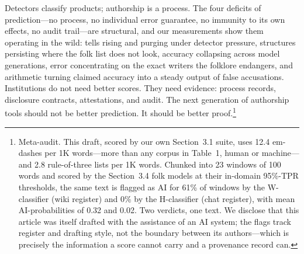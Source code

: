 \documentclass[sigconf,nonacm]{acmart}
\begin{document}
Detectors classify products; authorship is a process. The four deficits of prediction---no process, no individual error guarantee, no immunity to its own effects, no audit trail---are structural, and our measurements show them operating in the wild: tells rising and purging under detector pressure, structures persisting where the folk list does not look, accuracy collapsing across model generations, error concentrating on the exact writers the folklore endangers, and arithmetic turning claimed accuracy into a steady output of false accusations. Institutions do not need better scores. They need evidence: process records, disclosure contracts, attestations, and audit. The next generation of authorship tools should not be better prediction. It should be better proof.\footnote{Meta-audit. This draft, scored by our own Section~3.1 suite, uses 12.4 em-dashes per 1K words---more than any corpus in Table~1, human or machine---and 2.8 rule-of-three lists per 1K words. Chunked into 23 windows of 100 words and scored by the Section~3.4 folk models at their in-domain 95\%-TPR thresholds, the same text is flagged as AI for 61\% of windows by the W-classifier (wiki register) and 0\% by the H-classifier (chat register), with mean AI-probabilities of 0.32 and 0.02. Two verdicts, one text. We disclose that this article was itself drafted with the assistance of an AI system; the flags track register and drafting style, not the boundary between its authors---which is precisely the information a score cannot carry and a provenance record can.}
\end{document}
